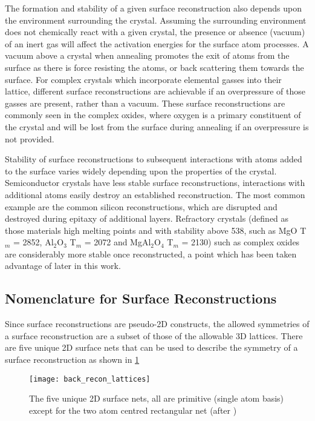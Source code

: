 The formation and stability of a given surface reconstruction also depends upon the environment surrounding the crystal. Assuming the surrounding environment does not chemically react with a given crystal, the presence or absence (vacuum) of an inert gas will affect the activation energies for the surface atom processes. A vacuum above a crystal when annealing promotes the exit of atoms from the surface as there is force resisting the atoms, or back scattering them towards the surface. For complex crystals which incorporate elemental gasses into their lattice, different surface reconstructions are achievable if an overpressure of those gasses are present, rather than a vacuum. These surface reconstructions are commonly seen in the complex oxides, where oxygen is a primary constituent of the crystal and will be lost from the surface during annealing if an overpressure is not provided.

Stability of surface reconstructions to subsequent interactions with atoms added to the surface varies widely depending upon the properties of the crystal. Semiconductor crystals have less stable surface reconstructions, interactions with additional atoms easily destroy an established reconstruction. The most common example are the common silicon reconstructions, which are disrupted and destroyed during epitaxy of additional layers. Refractory crystals (defined as those materials high melting points and with stability above 538\celsius{}\cite{ASTMC71}, such as MgO T\(_m\) = 2852\celsius{}, Al\(_2\)O\(_3\) T\(_m\) = 2072\celsius{} and MgAl\(_2\)O\(_4\) T\(_m\) = 2130\celsius{}) such as complex oxides are considerably more stable once reconstructed, a point which has been taken advantage of later in this work.

\subsection{Nomenclature for Surface Reconstructions}
Since surface reconstructions are pseudo-2D constructs, the allowed symmetries of a surface reconstruction are a subset of those of the allowable 3D lattices. There are five unique 2D surface nets that can be used to describe the symmetry of a surface reconstruction as shown in \cref{fig:back_recon_lattices}
\begin{figure}
    \centering
    \texttt{[image: back\_recon\_lattices]}
    \caption[2D Surface Nets]{\label{fig:back_recon_lattices}The five unique 2D surface nets, all are primitive (single atom basis) except for the two atom centred rectangular net (after \cite{ohring2001materials})}
\end{figure}

